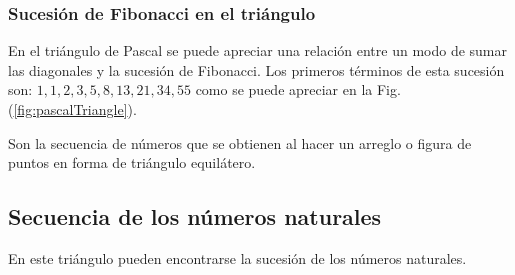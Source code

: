 \subsubsection{Sucesión de Fibonacci en el triángulo}
En el triángulo de Pascal se puede apreciar una relación entre un modo de sumar
las diagonales y la sucesión de Fibonacci. Los primeros términos de esta
sucesión son: $1,1,2,3,5,8,13,21,34,55$ como se puede apreciar en la Fig.
(\ref{fig:pascalTriangle}).
	
Son la secuencia de n\'umeros que se obtienen al hacer un arreglo o figura de
puntos en forma de tri\'angulo equil\'atero.

\begin{figure}[h!]
\end{figure}
	

\subsection{Secuencia de los n\'umeros naturales}

En este tri\'angulo pueden encontrarse la sucesi\'on de los n\'umeros naturales.

\begin{figure}[h!]
\end{figure}
